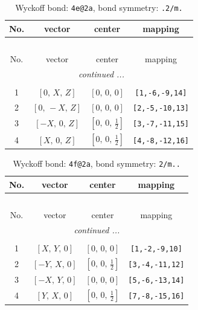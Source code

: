 \documentclass[fleqn,8pt]{jsarticle}
\begin{document}
\renewcommand{\arraystretch}{1.2}
\begin{longtable}{cccc}
\caption{Wyckoff bond: {\tt 4e@2a}, bond symmetry: {\tt .2/m.}}
 \\
 \hline \hline
No. & vector & center & mapping \\ \hline \endfirsthead

\multicolumn{3}{l}{\tablename\ \thetable{}} \\
 \hline \hline
No. & vector & center & mapping \\ \hline \endhead

 \hline \hline
\multicolumn{3}{r}{\footnotesize\it continued ...} \\ \endfoot

 \hline \hline
\multicolumn{3}{r}{} \\ \endlastfoot

1 & $\left[ 0,\, X,\, Z \right]$ & $\left[ 0,\, 0,\, 0 \right]$ & {\tt [1,-6,-9,14]} \\ \hline
2 & $\left[ 0,\, - X,\, Z \right]$ & $\left[ 0,\, 0,\, 0 \right]$ & {\tt [2,-5,-10,13]} \\ \hline
3 & $\left[ - X,\, 0,\, Z \right]$ & $\left[ 0,\, 0,\, \frac{1}{2} \right]$ & {\tt [3,-7,-11,15]} \\ \hline
4 & $\left[ X,\, 0,\, Z \right]$ & $\left[ 0,\, 0,\, \frac{1}{2} \right]$ & {\tt [4,-8,-12,16]} \\
\end{longtable}
\renewcommand{\arraystretch}{1.2}
\begin{longtable}{cccc}
\caption{Wyckoff bond: {\tt 4f@2a}, bond symmetry: {\tt 2/m..}}
 \\
 \hline \hline
No. & vector & center & mapping \\ \hline \endfirsthead

\multicolumn{3}{l}{\tablename\ \thetable{}} \\
 \hline \hline
No. & vector & center & mapping \\ \hline \endhead

 \hline \hline
\multicolumn{3}{r}{\footnotesize\it continued ...} \\ \endfoot

 \hline \hline
\multicolumn{3}{r}{} \\ \endlastfoot

1 & $\left[ X,\, Y,\, 0 \right]$ & $\left[ 0,\, 0,\, 0 \right]$ & {\tt [1,-2,-9,10]} \\ \hline
2 & $\left[ - Y,\, X,\, 0 \right]$ & $\left[ 0,\, 0,\, \frac{1}{2} \right]$ & {\tt [3,-4,-11,12]} \\ \hline
3 & $\left[ - X,\, Y,\, 0 \right]$ & $\left[ 0,\, 0,\, 0 \right]$ & {\tt [5,-6,-13,14]} \\ \hline
4 & $\left[ Y,\, X,\, 0 \right]$ & $\left[ 0,\, 0,\, \frac{1}{2} \right]$ & {\tt [7,-8,-15,16]} \\
\end{longtable}
\end{document}
